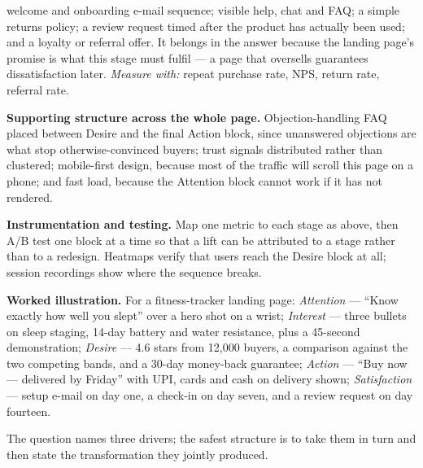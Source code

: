 \begin{qlist}
\begin{apts}
      welcome and onboarding e-mail sequence; visible help, chat and FAQ; a
      simple returns policy; a review request timed after the product has
      actually been used; and a loyalty or referral offer. It belongs in the
      answer because the landing page's promise is what this stage must
      fulfil --- a page that oversells guarantees dissatisfaction later.
      \emph{Measure with:} repeat purchase rate, NPS, return rate, referral
      rate.
\item \textbf{Supporting structure across the whole page.} Objection-handling
      FAQ placed between Desire and the final Action block, since unanswered
      objections are what stop otherwise-convinced buyers; trust signals
      distributed rather than clustered; mobile-first design, because most of
      the traffic will scroll this page on a phone; and fast load, because the
      Attention block cannot work if it has not rendered.
\item \textbf{Instrumentation and testing.} Map one metric to each stage as
      above, then A/B test one block at a time so that a lift can be attributed
      to a stage rather than to a redesign. Heatmaps verify that users reach the
      Desire block at all; session recordings show where the sequence breaks.
\item \textbf{Worked illustration.} For a fitness-tracker landing page:
      \emph{Attention} --- ``Know exactly how well you slept'' over a hero shot
      on a wrist; \emph{Interest} --- three bullets on sleep staging, 14-day
      battery and water resistance, plus a 45-second demonstration;
      \emph{Desire} --- 4.6 stars from 12{,}000 buyers, a comparison against
      the two competing bands, and a 30-day money-back guarantee;
      \emph{Action} --- ``Buy now --- delivered by Friday'' with UPI, cards and
      cash on delivery shown; \emph{Satisfaction} --- setup e-mail on day one,
      a check-in on day seven, and a review request on day fourteen.
\end{apts}

The question names three drivers; the safest structure is to take them in turn
and then state the transformation they jointly produced.


\end{qlist}
